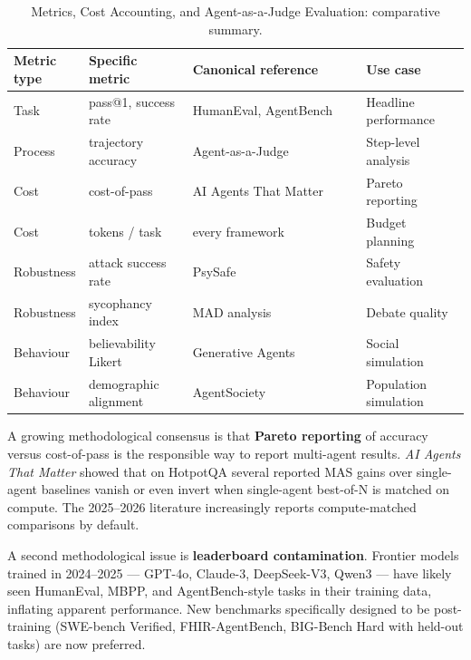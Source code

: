 \documentclass{article}
\begin{document}
\begin{table}[t]
\centering
\caption{Metrics, Cost Accounting, and Agent-as-a-Judge Evaluation: comparative summary.}
\label{tab:metrics-cost-accounting-and-agent-as-a-judge-evaluation-2}
\begin{tabular}{>{\raggedright\arraybackslash}p{0.1250\linewidth}
  >{\raggedright\arraybackslash}p{0.2386\linewidth}
  >{\raggedright\arraybackslash}p{0.3977\linewidth}
  >{\raggedright\arraybackslash}p{0.2386\linewidth}}
\toprule
Metric type & Specific metric & Canonical reference & Use case \\
\midrule
Task & pass@1, success rate & HumanEval, AgentBench & Headline performance \\
Process & trajectory accuracy & Agent-as-a-Judge \citep{zhuge20242024} & Step-level analysis \\
Cost & cost-of-pass & AI Agents That Matter \citep{kapoor2024aiagentsthatmatter} & Pareto reporting \\
Cost & tokens / task & every framework & Budget planning \\
Robustness & attack success rate & PsySafe \citep{zhang2024psysafeacomprehens} & Safety evaluation \\
Robustness & sycophancy index & MAD analysis \citep{liang2024encouragingdiverge} & Debate quality \\
Behaviour & believability Likert & Generative Agents \citep{park2023generativeagentsin} & Social simulation \\
Behaviour & demographic alignment & AgentSociety \citep{piao20252025} & Population simulation \\
\end{tabular}
\end{table}

A growing methodological consensus is that \textbf{Pareto reporting} of accuracy versus cost-of-pass is the responsible way to report multi-agent results. \emph{AI Agents That Matter} showed that on HotpotQA several reported MAS gains over single-agent baselines vanish or even invert when single-agent best-of-N is matched on compute. The 2025--2026 literature increasingly reports compute-matched comparisons by default.

A second methodological issue is \textbf{leaderboard contamination}. Frontier models trained in 2024--2025 --- GPT-4o, Claude-3, DeepSeek-V3, Qwen3 --- have likely seen HumanEval, MBPP, and AgentBench-style tasks in their training data, inflating apparent performance. New benchmarks specifically designed to be post-training (SWE-bench Verified, FHIR-AgentBench, BIG-Bench Hard with held-out tasks) are now preferred.
\end{document}
